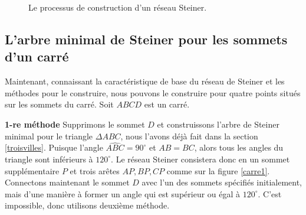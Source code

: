 \documentclass[10pt,a4paper]{article}%
\theoremstyle{theorem}
\theoremstyle{definition}
\begin{document}
\begin{enumerate}
\begin{figure}[h]
\begin{center}
        			\end{center}
        			\caption{Le processus de construction d'un réseau Steiner.}\label{reseau3}
        			\end{figure}
        		\end{enumerate}
        	
        \newpage
        \subsection{L'arbre minimal de Steiner pour les sommets d'un carré}
        	
			Maintenant, connaissant la caractéristique de base du réseau de Steiner et les méthodes pour le construire, nous pouvons le construire pour quatre points situés sur les sommets du carré.
		    Soit $ABCD$ est un carré.
		        
		    \textbf{1-re méthode} Supprimons le sommet $D$ et construissons l'arbre de Steiner minimal pour le triangle $\Delta ABC$, nous l'avons déjà fait dans la section \ref{troisvilles}. Puisque l'angle $\widehat{ABC}=90^\circ$ et $AB=BC$, alors tous les angles du triangle sont inférieurs à $120^\circ$. Le réseau Steiner consistera donc en un sommet supplémentaire $P$ et trois arêtes $AP,BP,CP$ comme sur la figure \ref{carre1}. Connectons maintenant le sommet $D$ avec l'un des sommets spécifiés initialement, mais d'une manière à former un angle qui est supérieur ou égal à $120^\circ$. C'est impossible, donc utilisons deuxième méthode.
		         
\end{document}
